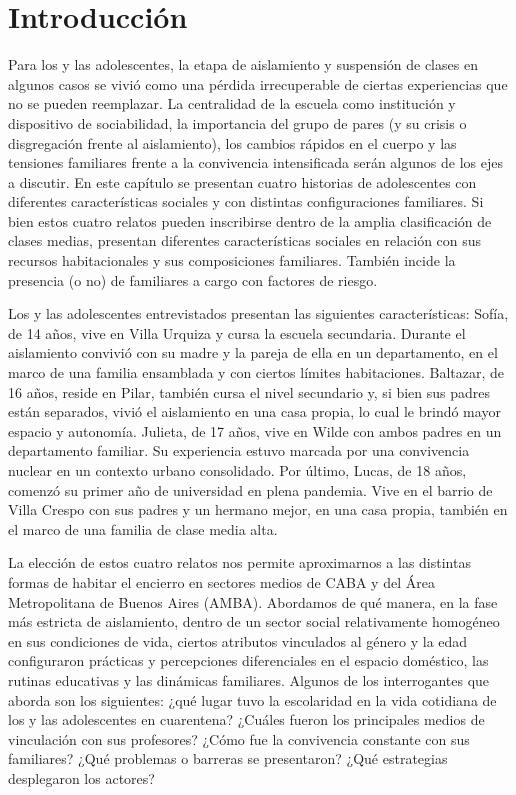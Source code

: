 
\begin{refsection}

\label{cap-26}


\section[Introducción]{Introducción}
\label{cap-26.introduccion}
Para los y las adolescentes, la etapa de aislamiento y suspensión de clases en algunos casos se vivió como una pérdida irrecuperable de ciertas experiencias que no se pueden reemplazar. La centralidad de la escuela como institución y dispositivo de sociabilidad, la importancia del grupo de pares (y su crisis o disgregación frente al aislamiento), los cambios rápidos en el cuerpo y las tensiones familiares frente a la convivencia intensificada serán algunos de los ejes a discutir. En este capítulo se presentan cuatro historias de adolescentes con diferentes características sociales y con distintas configuraciones familiares. Si bien estos cuatro relatos pueden inscribirse dentro de la amplia clasificación de clases medias, presentan diferentes características sociales en relación con sus recursos habitacionales y sus composiciones familiares. También incide la presencia (o no) de familiares a cargo con factores de riesgo.

Los y las adolescentes entrevistados presentan las siguientes características: Sofía, de 14 años, vive en Villa Urquiza y cursa la escuela secundaria. Durante el aislamiento convivió con su madre y la pareja de ella en un departamento, en el marco de una familia ensamblada y con ciertos límites habitaciones. Baltazar, de 16 años, reside en Pilar, también cursa el nivel secundario y, si bien sus padres están separados, vivió el aislamiento en una casa propia, lo cual le brindó mayor espacio y autonomía. Julieta, de 17 años, vive en Wilde con ambos padres en un departamento familiar. Su experiencia estuvo marcada por una convivencia nuclear en un contexto urbano consolidado. Por último, Lucas, de 18 años, comenzó su primer año de universidad en plena pandemia. Vive en el barrio de Villa Crespo con sus padres y un hermano mejor, en una casa propia, también en el marco de una familia de clase media alta.

La elección de estos cuatro relatos nos permite aproximarnos a las distintas formas de habitar el encierro en sectores medios de CABA y del Área Metropolitana de Buenos Aires (AMBA). Abordamos de qué manera, en la fase más estricta de aislamiento, dentro de un sector social relativamente homogéneo en sus condiciones de vida, ciertos atributos vinculados al género y la edad configuraron prácticas y percepciones diferenciales en el espacio doméstico, las rutinas educativas y las dinámicas familiares. Algunos de los interrogantes que aborda son los siguientes: ¿qué lugar tuvo la escolaridad en la vida cotidiana de los y las adolescentes en cuarentena? ¿Cuáles fueron los principales medios de vinculación con sus profesores? ¿Cómo fue la convivencia constante con sus familiares? ¿Qué problemas o barreras se presentaron? ¿Qué estrategias desplegaron los actores?



\end{refsection}
